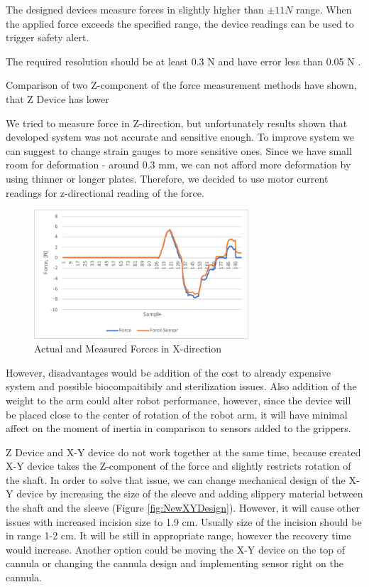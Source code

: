 	The designed devices measure forces in slightly higher than $\pm 11 N$ range. When the applied force exceeds the specified range, the device readings can be used to trigger safety alert.
	
	The required resolution should be at least 0.3 N and have error less than 0.05 N \cite{mack_interactive_2012}.
	
	Comparison of two Z-component of the force measurement methods have shown, that Z Device has lower 
	
We tried to measure force in Z-direction, but unfortunately results shown that developed system was not accurate and sensitive enough. To improve system we can suggest to change strain gauges to more sensitive ones. Since we have small room for deformation - around 0.3 mm, we can not afford more deformation by using thinner or longer plates. Therefore, we decided to use motor current readings for z-directional reading of the force.
	

\begin{figure}[h]
	\begin{center}
	\includegraphics[width=80mm]{fig/results/syst_error.pdf}
	\end{center}
	\vspace{-4mm}
	\caption[Actual and Measured Forces in X-direction]
	{Actual and Measured Forces in X-direction}
	\label{fig:Syst_err}
	\vspace{-2mm}
\end{figure}

However, disadvantages would be addition of the cost to already expensive system and possible biocompaitibily and sterilization issues. Also addition of the weight to the arm could alter robot performance, however, since the device will be placed close to the center of rotation of the robot arm, it will have minimal affect on the moment of inertia  in comparison to sensors added to the grippers.

Z Device and X-Y device do not work together at the same time, because created X-Y device takes the Z-component of the force and slightly restricts rotation of the shaft. In order to solve that issue, we can change mechanical design of the X-Y device by increasing the size of the sleeve and adding slippery material between the shaft and the sleeve (Figure \ref{fig:NewXYDesign}). However, it will cause other issues with increased incision size to 1.9 cm. Usually size of the incision should be in range 1-2 cm. It will be still in appropriate range, however the recovery time would increase. Another option could be moving the X-Y device on the top of cannula or changing the cannula design and implementing sensor right on the cannula.

